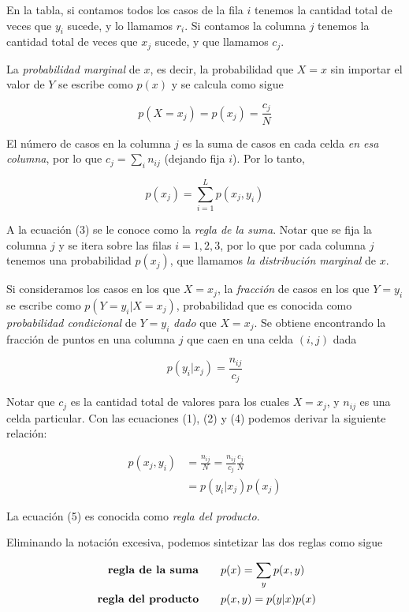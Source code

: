 \documentclass[
  letterpaper,
  DIV=11,
  numbers=noendperiod]{scrartcl}
\begin{document}
En la tabla, si contamos todos los casos de la fila \(i\) tenemos la
cantidad total de veces que \(y_i\) sucede, y lo llamamos \(r_i\). Si
contamos la columna \(j\) tenemos la cantidad total de veces que \(x_j\)
sucede, y que llamamos \(c_j\).

La \emph{probabilidad marginal} de \(x\), es decir, la probabilidad que
\(X=x\) sin importar el valor de \(Y\) se escribe como \(p(x)\) y se
calcula como sigue

\[
  p(X = x_j) = p(x_j) = \frac{c_j}{N} \tag{2}
\]

El número de casos en la columna \(j\) es la suma de casos en cada celda
\emph{en esa columna}, por lo que \(c_j = \sum_i n_{ij}\) (dejando fija
\(i\)). Por lo tanto,

\[
  p(x_j) = \sum_{i=1}^Lp(x_j, y_i) \tag{3}
\]

A la ecuación (3) se le conoce como la \emph{regla de la suma}. Notar
que se fija la columna \(j\) y se itera sobre las filas \(i=1, 2, 3\),
por lo que por cada columna \(j\) tenemos una probabilidad \(p(x_j)\),
que llamamos \emph{la distribución marginal} de \(x\).

Si consideramos los casos en los que \(X=x_j\), la \emph{fracción} de
casos en los que \(Y=y_i\) se escribe como \(p(Y=y_i | X=x_j)\),
probabilidad que es conocida como \emph{probabilidad condicional} de
\(Y=y_i\) \emph{dado} que \(X=x_j\). Se obtiene encontrando la fracción
de puntos en una columna \(j\) que caen en una celda \((i,j)\) dada

\[
  p(y_i | x_j) = \frac{n_{ij}}{c_j} \tag{4}
\]

Notar que \(c_j\) es la cantidad total de valores para los cuales
\(X=x_j\), y \(n_{ij}\) es una celda particular. Con las ecuaciones (1),
(2) y (4) podemos derivar la siguiente relación:

\begin{align*}
p(x_j, y_i) &= \frac{n_{ij}}{N} = \frac{n_{ij}}{c_j} \frac{c_j}{N}\\
&= p(y_i | x_j)p(x_j) \tag{5}
\end{align*}

La ecuación (5) es conocida como \emph{regla del producto}.

Eliminando la notación excesiva, podemos sintetizar las dos reglas como
sigue

\begin{align*}
\text{ \textbf{regla de la suma}}\quad\quad &p(x) = \sum_{y}p(x,y) \\
\text{ \textbf{regla del producto}}\quad\quad &p(x, y) = p(y|x)p(x)
\end{align*}
\end{document}
